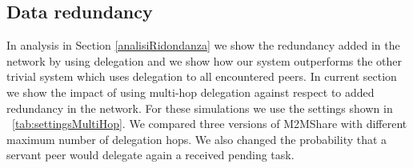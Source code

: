 
%
%

\newpage
\subsection{Data redundancy}
\label{analisiRidondanzaMultiHop}
In analysis in Section \ref{analisiRidondanza} we show the redundancy added in the network by using delegation and we show how our system outperforms the other trivial system which uses delegation to all encountered peers. In current section we show the impact of using multi-hop delegation against respect to added redundancy in the network. For these simulations we use the settings shown in \tablename~\ref{tab:settingsMultiHop}. We compared three versions of M2MShare with different maximum number of delegation hops. We also changed the probability that a servant peer would delegate again a received pending task.
\\

